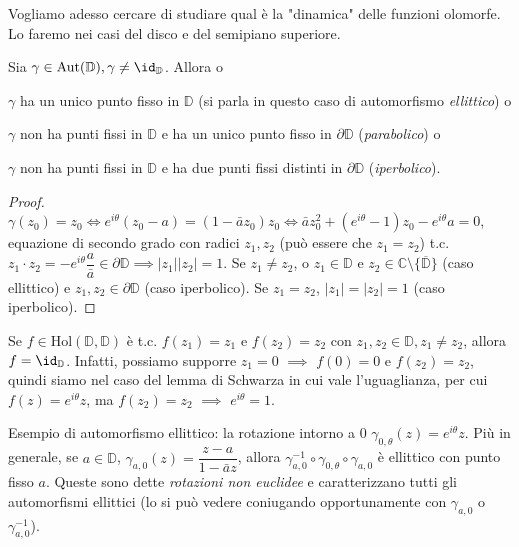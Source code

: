Vogliamo adesso cercare di studiare qual è la "dinamica" delle funzioni olomorfe. Lo faremo nei casi del disco e del semipiano superiore.

\begin{prop}
  Sia $\gamma \in \text{Aut}(\mathbb{D}), \gamma \not=\id_{\mathbb{D}}$. Allora o
  \begin{nlist}
    \item $\gamma$ ha un unico punto fisso in $\mathbb{D}$ (si parla in questo caso di automorfismo \textit{ellittico}) o
    \item $\gamma$ non ha punti fissi in $\mathbb{D}$ e ha un unico punto fisso in $\partial\mathbb{D}$ (\textit{parabolico}) o
    \item $\gamma$ non ha punti fissi in $\mathbb{D}$ e ha due punti fissi distinti in $\partial\mathbb{D}$ (\textit{iperbolico}).
  \end{nlist}
\end{prop}

\begin{proof}
  $\gamma(z_0)=z_0 \iff e^{i\theta}(z_0-a)=(1-\bar{a}z_0)z_0 \iff \bar{a}z_0^2+(e^{i\theta}-1)z_0-e^{i\theta}a=0$, equazione di secondo grado con radici $z_1, z_2$ (può essere che $z_1=z_2$) t.c.
  $z_1 \cdot z_2=-e^{i\theta}\dfrac{a}{\bar{a}} \in \partial\mathbb{D} \implies |z_1||z_2|=1$.
  Se $z_1 \not=z_2$, o $z_1 \in \mathbb{D}$ e $z_2 \in \mathbb{C} \setminus \{\overline{\mathbb{D}}\}$ (caso ellittico) e $z_1, z_2 \in \partial\mathbb{D}$ (caso iperbolico). Se $z_1=z_2$, $|z_1|=|z_2|=1$ (caso iperbolico).
\end{proof}

\begin{oss}
  Se $f \in \text{Hol}(\mathbb{D}, \mathbb{D})$ è t.c. $f(z_1)=z_1$ e $f(z_2)=z_2$ con $z_1, z_2 \in \mathbb{D}, z_1 \not=z_2$, allora $f=\id_{\mathbb{D}}$.
  Infatti, possiamo supporre $z_1=0$ $\implies$ $f(0)=0$ e $f(z_2)=z_2$, quindi siamo nel caso del lemma di Schwarza in cui vale l'uguaglianza, per cui $f(z)=e^{i\theta}z$, ma $f(z_2)=z_2$ $\implies$ $e^{i\theta}=1$.
\end{oss}

\begin{ex}
  Esempio di automorfismo ellittico: la rotazione intorno a $0$ $\gamma_{0, \theta}(z)=e^{i\theta}z$. Più in generale, se $a \in \mathbb{D}$, $\gamma_{a, 0}(z)=\dfrac{z-a}{1-\bar{a}z}$, allora $\gamma_{a, 0}^{-1} \circ \gamma_{0, \theta} \circ \gamma_{a, 0}$ è ellittico con punto fisso $a$.
  Queste sono dette \textit{rotazioni non euclidee} e caratterizzano tutti gli automorfismi ellittici (lo si può vedere coniugando opportunamente con $\gamma_{a, 0}$ o $\gamma_{a, 0}^{-1}$).
\end{ex}

